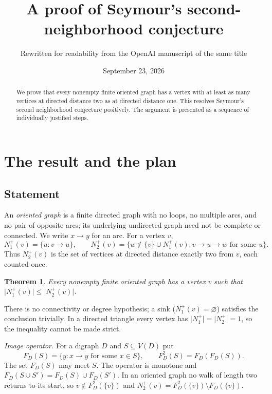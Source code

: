 \documentclass[11pt]{article}
\title{A proof of Seymour's second-neighborhood conjecture}
\author{Rewritten for readability from the OpenAI manuscript of the same title}
\date{September 23, 2026}
\newtheorem{theorem}{Theorem}[section]
\theoremstyle{remark}
\newcommand{\abs}[1]{\lvert #1\rvert}
\begin{document}
\maketitle
\begin{abstract}
We prove that every nonempty finite oriented graph has a vertex with at least
as many vertices at directed distance two as at directed distance one.
This resolves Seymour's second neighborhood conjecture positively.
The argument is presented as a sequence of individually justified steps.
\end{abstract}

\section{The result and the plan}\label{sec:introduction}

\subsection*{Statement}
An \emph{oriented graph} is a finite directed graph with no loops, no multiple
arcs, and no pair of opposite arcs; its underlying undirected graph need not be
complete or connected. We write $x\to y$ for an arc. For a vertex $v$,
\[
 N_1^+(v)=\{u:v\to u\},\qquad
 N_2^+(v)=\{w\notin\{v\}\cup N_1^+(v):v\to u\to w\text{ for some }u\}.
\]
Thus $N_2^+(v)$ is the set of vertices at directed distance exactly two from
$v$, each counted once.

\begin{theorem}\label{thm:main}
Every nonempty finite oriented graph has a vertex \(v\) such that
\(\abs{N_1^+(v)}\leq\abs{N_2^+(v)}\).
\end{theorem}

There is no connectivity or degree hypothesis; a sink ($N_1^+(v)=\varnothing$)
satisfies the conclusion trivially. In a directed triangle every vertex has
$\abs{N_1^+}=\abs{N_2^+}=1$, so the inequality cannot be made strict.

\emph{Image operator.} For a digraph $D$ and $S\subseteq V(D)$ put
\[
 F_D(S)=\{y:x\to y\text{ for some }x\in S\},\qquad F_D^2(S)=F_D(F_D(S)).
\]
The set $F_D(S)$ may meet $S$. The operator is monotone and
$F_D(S\cup S')=F_D(S)\cup F_D(S')$. In an oriented graph no walk of length two
returns to its start, so $v\notin F_D^2(\{v\})$ and
$N_2^+(v)=F_D^2(\{v\})\setminus F_D(\{v\})$.
\end{document}
